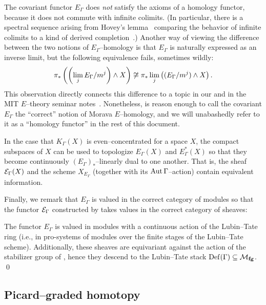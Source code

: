 \begin{remark}
The covariant functor $E_\Gamma$ does \emph{not} satisfy the axioms of a homology functor, because it does not commute with infinite colimits.  (In particular, there is a spectral sequence arising from Hovey's lemma~\cite[Lemma 2.3]{HoveyCSC} comparing the behavior of infinite colimits to a kind of derived completion~\cite{HoveyFilteredColimits}.)  Another way of viewing the difference between the two notions of $E_\Gamma$--homology is that $E_\Gamma$ is naturally expressed as an inverse limit, but the following equivalence fails, sometimes wildly: \[\pi_* \left(\left(\lim_j E_\Gamma / m^j\right) \wedge X\right) \not\cong \pi_* \lim_j \left( (E_\Gamma / m^j) \wedge X \right).\] This observation directly connects this difference to a topic in our  and in the MIT $E$--theory seminar notes~\cite[Section 14]{MITETheory}.  Nonetheless,  is reason enough to call the covariant $E_\Gamma$ the ``correct'' notion of Morava $E$--homology, and we will unabashedly refer to it as a ``homology functor'' in the rest of this document.
\end{remark}

\begin{remark}
In the case that $K_\Gamma(X)$ is even--concentrated for a space $X$, the compact subspaces of $X$ can be used to topologize $E_\Gamma(X)$ and $E_\Gamma^*(X)$ so that they become continuously $(E_\Gamma)_*$--linearly dual to one another.  That is, the sheaf $\mathcal{E}_\Gamma(X)$ and the scheme $X_{E_\Gamma}$ (together with its $\operatorname{Aut} \Gamma$--action) contain equivalent information.
\end{remark}

Finally, we remark that $E_\Gamma$ is valued in the correct category of modules so that the functor $\mathcal{E}_\Gamma$ constructed by  takes values in the correct category of sheaves:
\begin{lemma}\label{EthyGivesASheaf}
The functor $E_\Gamma$ is valued in modules with a continuous action of the Lubin--Tate ring (i.e., in pro-systems of modules over the finite stages of the Lubin--Tate scheme).  Additionally, these sheaves are equivariant against the action of the stabilizer group of , hence they descend to the Lubin--Tate stack $\operatorname{Def}(\Gamma) \subseteq \mathcal{M}_{\mathbf{fg}}$. \qed
\end{lemma}


\subsection*{Picard--graded homotopy}\label{SectionPicardGradedHomotopy}

